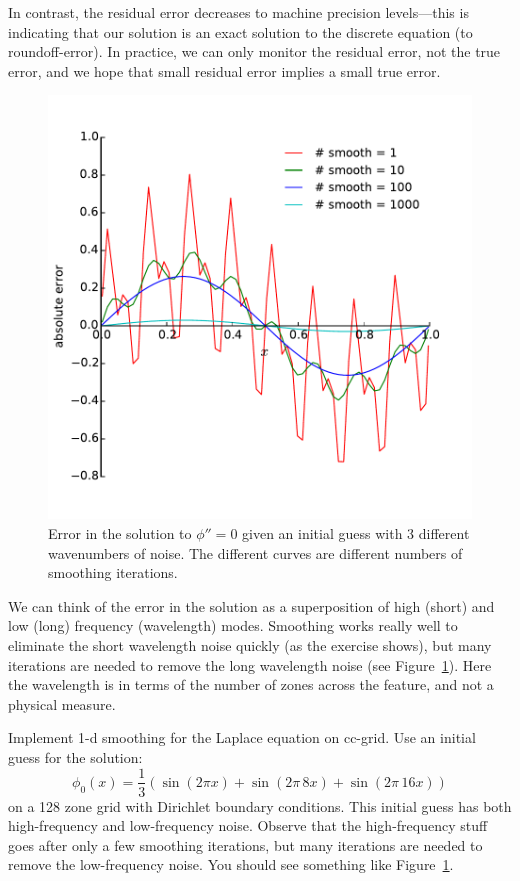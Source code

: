 In contrast, the residual error decreases to machine precision
levels---this is indicating that our solution is an exact solution to
the discrete equation (to roundoff-error).
In practice, we can only monitor the residual error, not the true
error, and we hope that small residual error implies a small true
error.

\begin{figure}[t]
\centering
\includegraphics[width=0.8\linewidth]{smooth-multimode}
\caption[Smoothing of different wavenumbers]{\label{fig:smooth} Error
  in the solution to $\phi'' = 0$ given an initial guess with 3
  different wavenumbers of noise.  The different curves are different
  numbers of smoothing iterations. \\
  }
\end{figure}

We can think of the error in the solution as a superposition of high
(short) and low (long) frequency (wavelength) modes.  Smoothing works
really well to eliminate the short wavelength noise quickly (as the
exercise shows), but many iterations are needed to remove the long
wavelength noise (see Figure~\ref{fig:smooth}).  Here the wavelength
is in terms of the number of zones across the feature, and not a
physical measure.  

\begin{exercise}
{Implement 1-d smoothing for the Laplace equation on
  cc-grid.  Use an initial guess for the solution:
  \begin{equation}
  \phi_0(x) = \frac{1}{3} ( \sin(2\pi x) + \sin(2\pi \, 8 x) + \sin(2\pi \, 16 x) )
  \end{equation}
  on a 128 zone grid with Dirichlet boundary conditions.  This initial
  guess has both high-frequency and low-frequency noise.  Observe that
  the high-frequency stuff goes after only a few smoothing iterations,
  but many iterations are needed to remove the low-frequency noise.
  You should see something like Figure~\ref{fig:smooth}.
}
\end{exercise}

